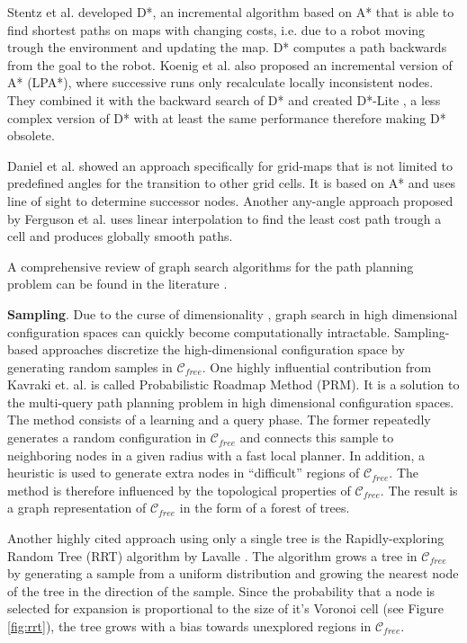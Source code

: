 \message{ !name(proposal.tex)}\documentclass[11pt,twocolumn]{article}
\begin{document}
Stentz et al. developed D*, an incremental algorithm based on A* that
is able to find shortest paths on maps with changing costs, i.e. due
to a robot moving trough the environment and updating the map. D*
computes a path backwards from the goal to the robot. Koenig et
al. \cite{koenigIncremental2001} also proposed an incremental version
of A* (LPA*), where successive runs only recalculate locally
inconsistent nodes. They combined it with the backward search of D*
and created D*-Lite \cite{koenigLite2002}, a less complex version of
D* with at least the same performance therefore making D* obsolete.

Daniel et al. \cite{danielThetaAnyAnglePath2010} showed an approach
specifically for grid-maps that is not limited to predefined angles
for the transition to other grid cells. It is based on A* and uses
line of sight to determine successor nodes. Another any-angle approach
proposed by Ferguson et al.  \cite{fergusonFieldAlgorithmImproved2005}
uses linear interpolation to find the least cost path trough a cell
and produces globally smooth paths.

A comprehensive review of graph search algorithms for the path
planning problem can be found in the literature
\cite{aitsaadiUAVPathPlanning2022,sanchez-ibanezPathPlanningAutonomous2021,yanComprehensiveSurveyAnalysis2020,nashAnyAnglePathPlanning2013}.

\textbf{Sampling}. Due to the curse of dimensionality
\cite{bellmanDynamicProgramming1984}, graph search in high dimensional
configuration spaces can quickly become computationally intractable.
Sampling-based approaches discretize the high-dimensional
configuration space by generating random samples in
\(\mathcal{C}_{free}\). One highly influential contribution from
Kavraki et. al. \cite{kavrakiProbabilisticRoadmapsPath1996} is called
Probabilistic Roadmap Method (PRM). It is a solution to the
multi-query path planning problem in high dimensional configuration
spaces. The method consists of a learning and a query phase. The
former repeatedly generates a random configuration in
\(\mathcal{C}_{free}\) and connects this sample to neighboring nodes
in a given radius with a fast local planner. In addition, a heuristic
is used to generate extra nodes in ``difficult'' regions of
\(\mathcal{C}_{free}\). The method is therefore influenced by the
topological properties of \(\mathcal{C}_{free}\). The result is a
graph representation of \(\mathcal{C}_{free}\) in the form of a forest
of trees.

Another highly cited approach using only a single tree is the
Rapidly-exploring Random Tree (RRT) algorithm by Lavalle
\cite{lavalleRapidlyExploringRandomTrees1998}. The algorithm grows a
tree in \(\mathcal{C}_{free}\) by generating a sample from a uniform
distribution and growing the nearest node of the tree in the direction
of the sample. Since the probability that a node is selected for
expansion is proportional to the size of it's Voronoi cell (see Figure
\ref{fig:rrt}), the tree grows with a bias towards unexplored regions
in \(\mathcal{C}_{free}\).
\end{document}
